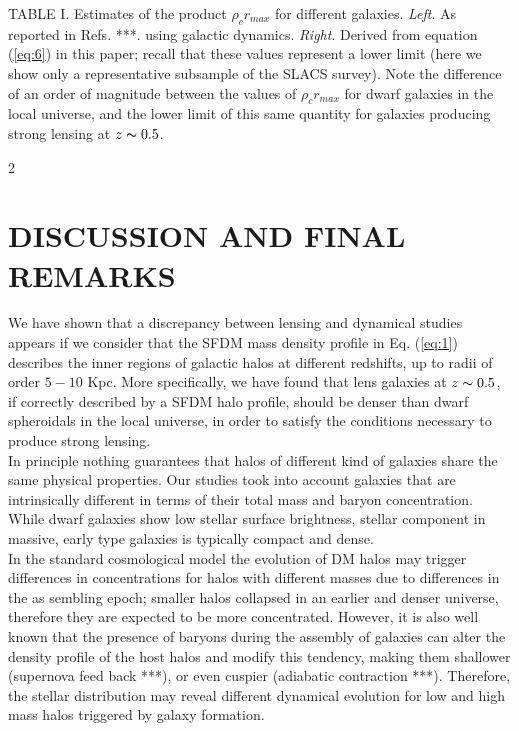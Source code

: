 \documentclass[10pt, letterpaper]{article}
\begin{document}
		TABLE I. Estimates of the product $\rho_c r_{max}$ for different galaxies. \emph{Left}. As reported in Refs. ***.  using galactic dynamics. \emph{Right}. Derived from equation (\ref{eq:6}) in this paper; recall that these values represent a lower limit (here we show only a representative subsample of the SLACS survey). Note the difference of an order of magnitude between the values of $\rho_c r_{max}$ for dwarf galaxies in the local universe, and the lower limit of this same quantity for galaxies producing strong lensing at $z  \thicksim 0.5$.
	\begin{multicols}{2}
		\section{\centering\small\selectfont DISCUSSION AND FINAL REMARKS}
		We have shown that a discrepancy between lensing and dynamical studies appears if we consider that the SFDM mass density profile in Eq. (\ref{eq:1}) describes the inner regions of galactic halos at different redshifts, up to radii of order $5 - 10$ Kpc. More specifically, we have found that lens galaxies at $z \thicksim 0.5$, if correctly described by a SFDM halo profile, should be denser than dwarf spheroidals in the local universe, in order to satisfy the conditions necessary to produce strong lensing.\\
		In principle nothing guarantees that halos of different kind of galaxies share the same physical properties. Our studies took into account galaxies that are intrinsically different in terms of their total mass and baryon concentration. While dwarf galaxies show low stellar surface brightness, stellar component in massive, early type galaxies is typically compact and dense. \\
		In the standard cosmological model the evolution of DM halos may trigger differences in concentrations for halos with different masses due to differences in the as sembling epoch; smaller halos collapsed in an earlier and denser universe, therefore they are expected to be more concentrated. However, it is also well known that the presence of baryons during the assembly of galaxies can alter the density profile of the host halos and modify this tendency, making them shallower (supernova feed back ***), or even cuspier (adiabatic contraction ***). Therefore, the stellar distribution may reveal different dynamical evolution for low and high mass halos triggered by galaxy formation. \\

\end{multicols}
\end{document}
